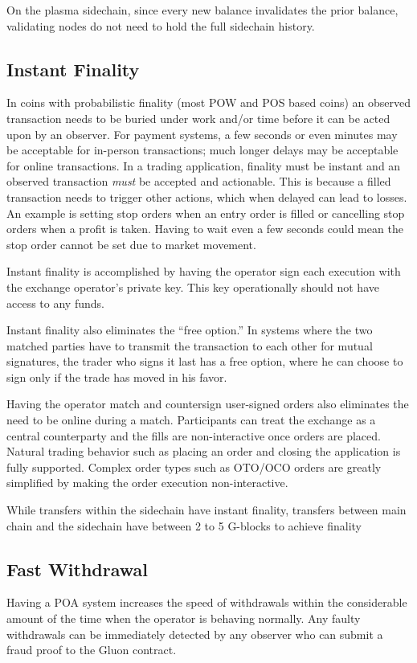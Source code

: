 \documentclass[12pt,a4paper]{article}
\begin{document}
On the plasma sidechain, since every new balance invalidates the prior balance, validating nodes do not need to hold the full sidechain history.

\subsection{Instant Finality}

In coins with probabilistic finality (most POW and POS based coins) an observed transaction needs to be buried under work and/or time before it can be acted upon by an observer. For payment systems, a few seconds or even minutes may be acceptable for in-person transactions; much longer delays may be acceptable for online transactions. In a trading application, finality must be instant and an observed transaction \emph{must} be accepted and actionable. This is because a filled transaction needs to trigger other actions, which when delayed can lead to losses. An example is setting stop orders when an entry order is filled or cancelling stop orders when a profit is taken. Having to wait even a few seconds could mean the stop order cannot be set due to market movement.

Instant finality is accomplished by having the operator sign each execution with the exchange operator’s private key. This key operationally should not have access to any funds.

Instant finality also eliminates the “free option.” In systems where the two matched parties have to transmit the transaction to each other for mutual signatures, the trader who signs it last has a free option, where he can choose to sign only if the trade has moved in his favor.

Having the operator match and countersign user-signed orders also eliminates the need to be online during a match. Participants can treat the exchange as a central counterparty and the fills are non-interactive once orders are placed. Natural trading behavior such as placing an order and closing the application is fully supported. Complex order types such as OTO/OCO orders\cite{invOT} are greatly simplified by making the order execution non-interactive.

While transfers within the sidechain have instant finality, transfers between main chain and the sidechain have between 2 to 5 G-blocks to achieve finality

\subsection{Fast Withdrawal}
Having a POA system increases the speed of withdrawals within the considerable amount of the time when the operator is behaving normally. Any faulty withdrawals can be immediately detected by any observer who can submit a fraud proof to the Gluon contract.
\end{document}
